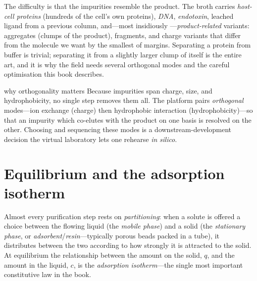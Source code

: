 The difficulty is that the impurities resemble the product. The broth carries
\emph{host-cell proteins} (hundreds of the cell's own proteins), \emph{DNA},
\emph{endotoxin}, leached ligand from a previous column, and---most insidiously
---\emph{product-related} variants: aggregates (clumps of the product), fragments,
and charge variants that differ from the molecule we want by the smallest of
margins. Separating a protein from buffer is trivial; separating it from a
slightly larger clump of itself is the entire art, and it is why the field needs
several orthogonal modes and the careful optimisation this book describes.

\begin{appbox}{why orthogonality matters}
Because impurities span charge, size, and hydrophobicity, no single step removes
them all. The platform pairs \emph{orthogonal} modes---ion exchange (charge) then
hydrophobic interaction (hydrophobicity)---so that an impurity which co-elutes
with the product on one basis is resolved on the other. Choosing and sequencing
these modes is a downstream-development decision the virtual laboratory lets one
rehearse \emph{in silico}.
\end{appbox}

\section{Equilibrium and the adsorption isotherm}
\label{sec:sep-isotherm}

Almost every purification step rests on \emph{partitioning}: when a solute is
offered a choice between the flowing liquid (the \emph{mobile phase}) and a solid
(the \emph{stationary phase}, or \emph{adsorbent}/\emph{resin}---typically porous
beads packed in a tube), it distributes between the two according to how strongly
it is attracted to the solid. At equilibrium the relationship between the amount
on the solid, $q$, and the amount in the liquid, $c$, is the \emph{adsorption
isotherm}---the single most important constitutive law in the book.

